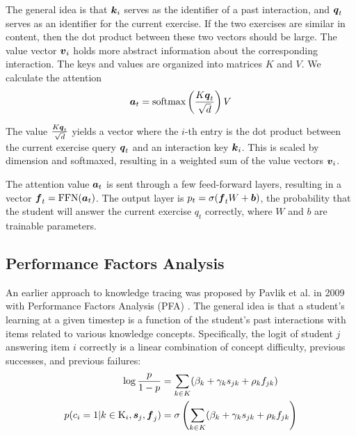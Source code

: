 The general idea is that $\boldsymbol{k}_i$ serves as the identifier of a past interaction, and $\boldsymbol{q}_t$ serves as an identifier for the current exercise. If the two exercises are similar in content, then the dot product between these two vectors should be large. The value vector $\boldsymbol{v}_i$ holds more abstract information about the corresponding interaction. The keys and values are organized into matrices $K$ and $V$. We calculate the attention
\begin{equation}
  \boldsymbol{a}_{t} = \text{softmax}\left(\frac{K \boldsymbol{q}_t}{\sqrt{d}} \right) V
  \label{eq:attn_sakt}
\end{equation}

The value $\frac{K \boldsymbol{q}_t}{\sqrt{d}}$ yields a vector where the $i$-th entry is the dot product between the current exercise query $\boldsymbol{q}_t$ and an interaction key $\boldsymbol{k}_i$. This is scaled by dimension and softmaxed, resulting in a weighted sum of the value vectors $\boldsymbol{v}_i$.

The attention value $\boldsymbol{a}_t$ is sent through a few feed-forward layers, resulting in a vector $\boldsymbol{f}_t = \text{FFN}(\boldsymbol{a}_t)$. The output layer is $p_t = \sigma(\boldsymbol{f}_t W + \boldsymbol{b})$, the probability that the student will answer the current exercise $q_t$ correctly, where $W$ and $b$ are trainable parameters.


\subsection{Performance Factors Analysis}
An earlier approach to knowledge tracing was proposed by Pavlik et al. in 2009 with Performance Factors Analysis (PFA) \cite{pavlik2009}. The general idea is that a student's learning at a given timestep is a function of the student's past interactions with items related to various knowledge concepts. Specifically, the logit of student $j$ answering item $i$ correctly is a linear combination of concept difficulty, previous successes, and previous failures:
\begin{equation}
  \begin{split}
    \log \frac{p}{1-p} &= \sum_{k \in K}(\beta_k + \gamma_k s_{jk} + \rho_k f_{jk}) \\
  p(c_i = 1 | k\in \text{K}_i, \boldsymbol{s}_j, \boldsymbol{f}_j) &= \sigma\left(\sum_{k \in K}(\beta_k + \gamma_k s_{jk} + \rho_k f_{jk}\right)
  \end{split}
  \label{eq:pfa}
\end{equation}

